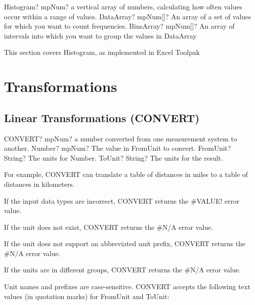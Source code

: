 \vspace{0.6cm}
\begin{mpFunctionsExtract}
	\mpWorksheetFunctionTwoNotImplemented
	{Histogram? mpNum? a vertical array of numbers, calculating how often values occur within a range of values.}
	{DataArray? mpNum[]? An array of a set of values for which you want to count frequencies.}
	{BinsArray? mpNum[]? An array of intervals into which you want to group the values in \textsf{DataArray}}
\end{mpFunctionsExtract}



\vspace{0.3cm}
This section covers Histogram, as implemented in Excel Toolpak



\newpage
\section{Transformations}


\subsection{Linear Transformations (CONVERT)}

\begin{mpFunctionsExtract}
	\mpWorksheetFunctionThreeNotImplemented
	{CONVERT? mpNum? a number converted from one measurement system to another.}
	{Number? mpNum? The value in \textsf{FromUnit} to convert.}
	{FromUnit? String? The units for \textsf{Number}.}
	{ToUnit? String? The units for the result.}
\end{mpFunctionsExtract}

\vspace{0.3cm}
For example, \textsf{CONVERT} can translate a table of distances in miles to a table of distances in kilometers.

If the input data types are incorrect, \textsf{CONVERT} returns the \#VALUE! error value.

If the unit does not exist, \textsf{CONVERT} returns the \#N/A error value.

If the unit does not support an abbreviated unit prefix, \textsf{CONVERT} returns the \#N/A error value.

If the units are in different groups, \textsf{CONVERT} returns the \#N/A error value.

Unit names and prefixes are case-sensitive.
\textsf{CONVERT} accepts the following text values (in quotation marks) for \textsf{FromUnit} and \textsf{ToUnit}:



